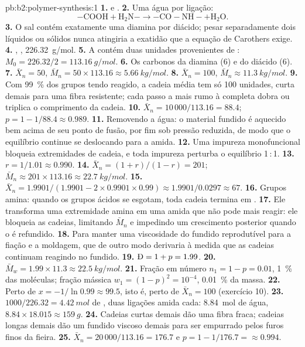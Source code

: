 \begin{solution}{pb:b2:polymer-synthesis:1}
\textbf{1.}  e .
\textbf{2.} Uma água por ligação:
\[\mathrm{{-}COOH + H_2N{-} \longrightarrow {-}CO{-}NH{-} + H_2O}.\]
\textbf{3.} O sal contém exatamente uma diamina por diácido; pesar separadamente dois líquidos ou
sólidos nunca atingiria a exatidão que a equação de Carothers exige.
\textbf{4.} \ce{-[NH(CH2)6NH-CO(CH2)4CO]-}, , \qty{226.32}{g/mol}.
\textbf{5.} A  contém duas unidades provenientes de : $M_0 = 226.32/2 = \qty{113.16}{g/mol}$.
\textbf{6.} Os carbonos da diamina (6) e do diácido (6).
\textbf{7.} $\bar X_n = 50$, $\bar M_n = 50 \times 113.16 \approx \qty{5.66}{kg/mol}$.
\textbf{8.} $\bar X_n = 100$, $\bar M_n \approx \qty{11.3}{kg/mol}$.
\textbf{9.} Com 99~\% dos grupos tendo reagido, a cadeia média tem só 100 unidades, curta demais para
uma fibra resistente; cada passo a mais rumo à  completa dobra ou triplica o comprimento da
cadeia.
\textbf{10.} $\bar X_n = 10\,000/113.16 = 88.4$; $p = 1 - 1/88.4 \approx 0.989$.
\textbf{11.} Removendo a água: o material fundido é aquecido bem acima de seu ponto de fusão, por fim sob
pressão reduzida, de modo que o equilíbrio continue se deslocando para a amida.
\textbf{12.} Uma impureza monofuncional bloqueia extremidades de cadeia, e toda impureza perturba o
equilíbrio 1\,:\,1.
\textbf{13.} $r = 1/1.01 \approx 0.990$.
\textbf{14.} $\bar X_n = (1+r)/(1-r) = 201$; $\bar M_n \approx 201 \times 113.16 \approx
\qty{22.7}{kg/mol}$.
\textbf{15.} $\bar X_n = 1.9901/(1.9901 - 2 \times 0.9901 \times 0.99) \approx 1.9901/0.0297 \approx
67$.
\textbf{16.} Grupos amina: quando os grupos ácidos se esgotam, toda cadeia termina em .
\textbf{17.} Ele transforma uma extremidade amina em uma amida que não pode mais reagir: ele bloqueia
as cadeias, limitando $\bar M_n$ e impedindo um crescimento posterior quando o  é refundido.
\textbf{18.} Para manter uma viscosidade do fundido reprodutível para a fiação e a moldagem, que de
outro modo derivaria à medida que as cadeias continuam reagindo no fundido.
\textbf{19.} $\text{\DH} = 1 + p = 1.99$.
\textbf{20.} $\bar M_w = 1.99 \times 11.3 \approx \qty{22.5}{kg/mol}$.
\textbf{21.} Fração em número $n_1 = 1 - p = 0.01$, 1~\% das moléculas; fração mássica $w_1 = (1-p)^2 =
10^{-4}$, 0.01~\% da massa.
\textbf{22.} Perto de $x = -1/\ln 0.99 \approx 99.5$, isto é, perto de $\bar X_n = 100$ (exercício 10).
\textbf{23.} $1000/226.32 = \qty{4.42}{mol}$ de , duas ligações amida cada: \qty{8.84}{mol} de
água, $8.84 \times 18.015 \approx \qty{159}{g}$.
\textbf{24.} Cadeias curtas demais dão uma fibra fraca; cadeias longas demais dão um fundido viscoso
demais para ser empurrado pelos furos finos da fieira.
\textbf{25.} $\bar X_n = 20\,000/113.16 = 176.7$ e $p = 1 - 1/176.7 = \boldsymbol{\approx 0.994}$.
\end{solution}
